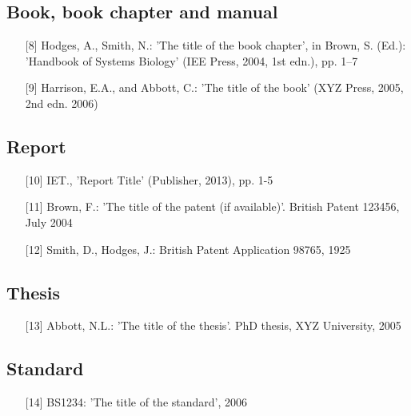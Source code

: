 \documentclass{cta-author}
\begin{document}
\subsection{Book, book chapter and manual}\label{subsec13.5}

\begin{enumerate}
\item[{[8]}] Hodges, A., Smith, N.: 'The title of the book chapter', in Brown, S.
(Ed.): 'Handbook of Systems Biology' (IEE Press, 2004, 1st edn.), pp. 1--7\vspace*{6pt}

\item[{[9]}]
Harrison, E.A., and Abbott, C.: 'The title of the book' (XYZ Press,
2005, 2nd edn. 2006)
\end{enumerate}

\subsection{Report}\label{subsec13.6}

\begin{enumerate}
\item[{[10]}] IET., 'Report Title' (Publisher, 2013), pp. 1-5\vspace*{6pt}

\item[{[11]}] Brown, F.: 'The title of the patent (if available)'. British Patent
123456, July\vadjust{\pagebreak} 2004

\item[{[12]}] Smith, D., Hodges, J.: British Patent Application 98765, 1925
\end{enumerate}

\subsection{Thesis}\label{subsec13.7}

\begin{enumerate}
\item[{[13]}]
Abbott, N.L.: 'The title of the thesis'. PhD thesis, XYZ University,
2005
\end{enumerate}

\subsection{Standard}\label{subsec13.8}

\begin{enumerate}
\item[{[14]}] BS1234: 'The title of the standard', 2006
\end{enumerate}
\end{document}
